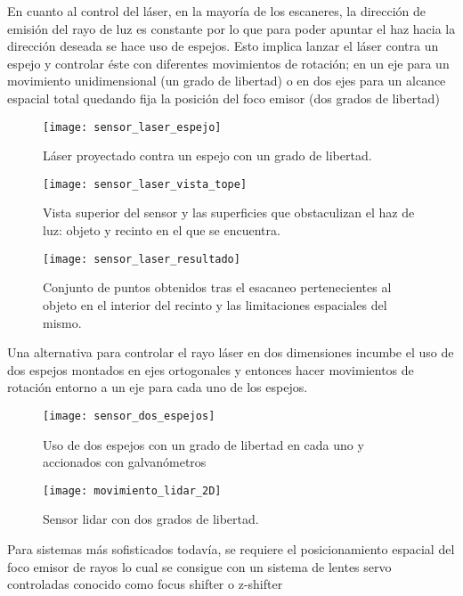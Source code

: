 En cuanto al control del láser\cite{control_laser}, en la mayoría de los escaneres, la dirección de emisión del rayo de luz es constante por lo que para poder apuntar el haz hacia la dirección deseada se hace uso de espejos. Esto implica lanzar el láser contra un espejo y controlar éste con diferentes movimientos de rotación; en un eje para un movimiento unidimensional (un grado de libertad) o en dos ejes para un alcance espacial total quedando fija la posición del foco emisor (dos grados de libertad)

\begin{figure}[!htb]
  \texttt{[image: sensor\_laser\_espejo]}
  \caption{Láser proyectado contra un espejo con un grado de libertad.}\label{fig:sensor laser completo - espejo}
\endminipage\hfill
{}
  \texttt{[image: sensor\_laser\_vista\_tope]}
  \caption{Vista superior del sensor y las superficies que obstaculizan el haz de luz: objeto y recinto en el que se encuentra.}\label{fig:sensor laser completo - vista tope}
\endminipage\hfill
{}
  \texttt{[image: sensor\_laser\_resultado]}
  \caption{Conjunto de puntos obtenidos tras el esacaneo pertenecientes al objeto en el interior del recinto y las limitaciones espaciales del mismo.}\label{fig:sensor laser completo - resultado}
\endminipage
\end{figure}

Una alternativa para controlar el rayo láser en dos dimensiones incumbe el uso de dos espejos montados en ejes ortogonales y entonces hacer movimientos de rotación entorno a un eje para cada uno de los espejos.

\begin{figure}
  \texttt{[image: sensor\_dos\_espejos]}
  \caption{Uso de dos espejos con un grado de libertad en cada uno y accionados con galvanómetros}\label{fig:sensor dos espejos}
\endminipage\hfill
{}
  \texttt{[image: movimiento\_lidar\_2D]}
  \caption{Sensor lidar con dos grados de libertad.}\label{fig:movimiento lidar 2D}
\endminipage\hfill

\end{figure}


Para sistemas más sofisticados todavía, se requiere el posicionamiento espacial del foco emisor de rayos lo cual se consigue con un sistema de lentes servo controladas conocido como focus shifter o z-shifter

